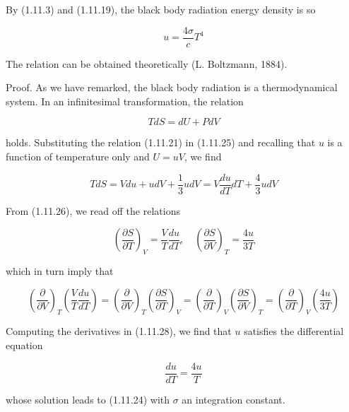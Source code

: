 \documentclass{article}
\begin{document}
By (1.11.3) and (1.11.19), the black body radiation energy density is so
 
\begin{equation*}
u=\frac{4 \sigma}{c} T^{4} \tag{1.11.24}
\end{equation*}
 

The relation can be obtained theoretically (L. Boltzmann, 1884).

Proof. As we have remarked, the black body radiation is a thermodynamical system. In an infinitesimal transformation, the relation
 
\begin{equation*}
T d S=d U+P d V \tag{1.11.25}
\end{equation*}
 
holds. Substituting the relation (1.11.21) in (1.11.25) and recalling that $u$ is a function of temperature only and $U=u V$, we find
 
\begin{equation*}
T d S=V d u+u d V+\frac{1}{3} u d V=V \frac{d u}{d T} d T+\frac{4}{3} u d V \tag{1.11.26}
\end{equation*}
 

From (1.11.26), we read off the relations
 
\begin{equation*}
\left(\frac{\partial S}{\partial T}\right)_{V}=\frac{V}{T} \frac{d u}{d T}, \quad\left(\frac{\partial S}{\partial V}\right)_{T}=\frac{4 u}{3 T} \tag{1.11.27}
\end{equation*}
 
which in turn imply that
 
\begin{equation*}
\left(\frac{\partial}{\partial V}\right)_{T}\left(\frac{V}{T} \frac{d u}{d T}\right)=\left(\frac{\partial}{\partial V}\right)_{T}\left(\frac{\partial S}{\partial T}\right)_{V}=\left(\frac{\partial}{\partial T}\right)_{V}\left(\frac{\partial S}{\partial V}\right)_{T}=\left(\frac{\partial}{\partial T}\right)_{V}\left(\frac{4 u}{3 T}\right) \tag{1.11.28}
\end{equation*}
 

Computing the derivatives in (1.11.28), we find that $u$ satisfies the differential equation
 
\begin{equation*}
\frac{d u}{d T}=\frac{4 u}{T} \tag{1.11.29}
\end{equation*}
 
whose solution leads to (1.11.24) with $\sigma$ an integration constant.
\end{document}
